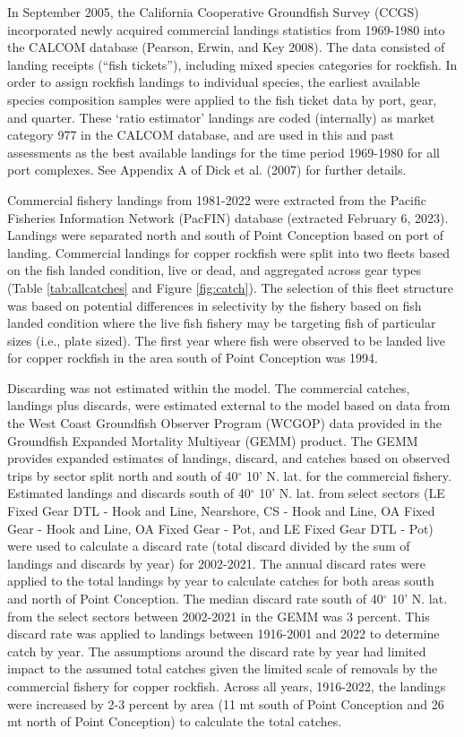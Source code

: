 \documentclass[11pt,
  english,
  letterpaper,
]{article}
\begin{document}
In September 2005, the California Cooperative Groundfish Survey (CCGS) incorporated newly acquired commercial landings statistics from 1969-1980 into the CALCOM database (Pearson, Erwin, and Key 2008). The data consisted of landing receipts (``fish tickets''), including mixed species categories for rockfish. In order to assign rockfish landings to individual species, the earliest available species composition samples were applied to the fish ticket data by port, gear, and quarter. These `ratio estimator' landings are coded (internally) as market category 977 in the CALCOM database, and are used in this and past assessments as the best available landings for the time period 1969-1980 for all port complexes. See Appendix A of Dick et al. (2007) for further details.

Commercial fishery landings from 1981-2022 were extracted from the Pacific Fisheries Information Network (PacFIN) database (extracted February 6, 2023). Landings were separated north and south of Point Conception based on port of landing. Commercial landings for copper rockfish were split into two fleets based on the fish landed condition, live or dead, and aggregated across gear types (Table \ref{tab:allcatches} and Figure \ref{fig:catch}). The selection of this fleet structure was based on potential differences in selectivity by the fishery based on fish landed condition where the live fish fishery may be targeting fish of particular sizes (i.e., plate sized). The first year where fish were observed to be landed live for copper rockfish in the area south of Point Conception was 1994.

Discarding was not estimated within the model. The commercial catches, landings plus discards, were estimated external to the model based on data from the West Coast Groundfish Observer Program (WCGOP) data provided in the Groundfish Expanded Mortality Multiyear (GEMM) product. The GEMM provides expanded estimates of landings, discard, and catches based on observed trips by sector split north and south of 40\(^\circ\) 10' N. lat. for the commercial fishery. Estimated landings and discards south of 40\(^\circ\) 10' N. lat. from select sectors (LE Fixed Gear DTL - Hook and Line, Nearshore, CS - Hook and Line, OA Fixed Gear - Hook and Line, OA Fixed Gear - Pot, and LE Fixed Gear DTL - Pot) were used to calculate a discard rate (total discard divided by the sum of landings and discards by year) for 2002-2021. The annual discard rates were applied to the total landings by year to calculate catches for both areas south and north of Point Conception. The median discard rate south of 40\(^\circ\) 10' N. lat. from the select sectors between 2002-2021 in the GEMM was 3 percent. This discard rate was applied to landings between 1916-2001 and 2022 to determine catch by year. The assumptions around the discard rate by year had limited impact to the assumed total catches given the limited scale of removals by the commercial fishery for copper rockfish. Across all years, 1916-2022, the landings were increased by 2-3 percent by area (11 mt south of Point Conception and 26 mt north of Point Conception) to calculate the total catches.
\end{document}
